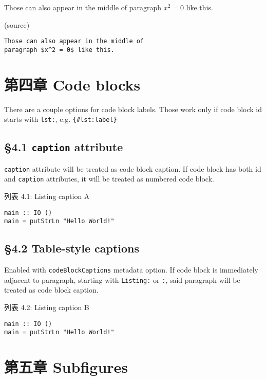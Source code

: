 \documentclass[
]{article}
\begin{document}
Those can also appear in the middle of paragraph \(x^{2} = 0\) like
this.

(source)

\begin{verbatim}
Those can also appear in the middle of 
paragraph $x^2 = 0$ like this.
\end{verbatim}

\hypertarget{ux7b2cux56dbux7ae0-code-blocks}{%
\section{第四章 Code blocks}\label{ux7b2cux56dbux7ae0-code-blocks}}

There are a couple options for code block labels. Those work only if
code block id starts with \texttt{lst:}, e.g. \texttt{\{\#lst:label\}}

\hypertarget{caption-attribute}{%
\subsection{\texorpdfstring{§4.1 \texttt{caption}
attribute}{§4.1 caption attribute}}\label{caption-attribute}}

\texttt{caption} attribute will be treated as code block caption. If
code block has both id and \texttt{caption} attributes, it will be
treated as numbered code block.

列表 4.1: Listing caption A

\begin{verbatim}
main :: IO ()
main = putStrLn "Hello World!"
\end{verbatim}

\hypertarget{table-style-captions}{%
\subsection{§4.2 Table-style captions}\label{table-style-captions}}

Enabled with \texttt{codeBlockCaptions} metadata option. If code block
is immediately adjacent to paragraph, starting with \texttt{Listing:} or
\texttt{:}, said paragraph will be treated as code block caption.

列表 4.2: Listing caption B

\begin{verbatim}
main :: IO ()
main = putStrLn "Hello World!"
\end{verbatim}

\hypertarget{ux7b2cux4e94ux7ae0-subfigures}{%
\section{第五章 Subfigures}\label{ux7b2cux4e94ux7ae0-subfigures}}
\end{document}
